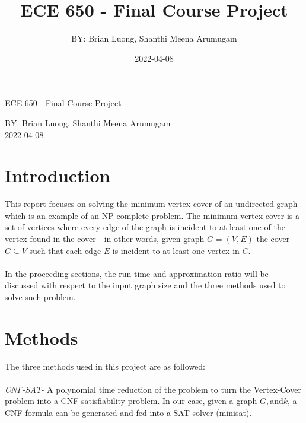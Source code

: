 \documentclass[11pt roman]{article}
\begin{document}

\title{ECE 650 - Final Course Project}
\author{BY: Brian Luong, Shanthi Meena Arumugam}
\date{2022-04-08}
\begin{titlepage}
    \vspace*{\fill}
    \begin{center}
	  \begin{huge} 
	  ECE 650 - Final Course Project \\
	  \end{huge}
	  
	  BY: Brian Luong, Shanthi Meena Arumugam\\
      2022-04-08
    \end{center}
    \vspace*{\fill}
\end{titlepage}

\pagebreak


\section{Introduction}
This report focuses on solving the minimum vertex cover of an undirected graph which is an example of an NP-complete problem. The minimum vertex cover is a set of vertices where every edge of the graph is incident to at least one of the vertex found in the cover - in other words, given graph $G=(V,E)$ the cover $C \subseteq V$ such that each edge $E$ is incident to at least one vertex in $C$. \\\\

In the proceeding sections, the run time and approximation ratio will be discussed with respect to the input graph size and the three methods used to solve such problem.
\section{Methods}
The three methods used in this project are as followed:\\\\

\emph{CNF-SAT}- A polynomial time reduction of the problem to turn the Vertex-Cover problem into a CNF satisfiability problem. In our case, given a graph $G, $and$ k$, a CNF formula can be generated and fed into a SAT solver (minisat).\\\\  
\end{document}
